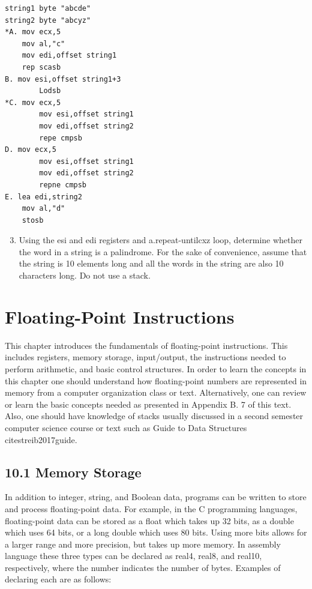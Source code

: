 \documentclass[10pt]{book}
\begin{document}
\begin{verbatim}
string1 byte "abcde"
string2 byte "abcyz"
*A. mov ecx,5
    mov al,"c"
    mov edi,offset string1
    rep scasb
B. mov esi,offset string1+3
        Lodsb
*C. mov ecx,5
        mov esi,offset string1
        mov edi,offset string2
        repe cmpsb
D. mov ecx,5
        mov esi,offset string1
        mov edi,offset string2
        repne cmpsb
E. lea edi,string2
    mov al,"d"
    stosb
\end{verbatim}

\begin{enumerate}
  \setcounter{enumi}{2}
  \item Using the esi and edi registers and a.repeat-untilcxz loop, determine whether the word in a string is a palindrome. For the sake of convenience, assume that the string is 10 elements long and all the words in the string are also 10 characters long. Do not use a stack.
\end{enumerate}


\section*{Floating-Point Instructions}
This chapter introduces the fundamentals of floating-point instructions. This includes registers, memory storage, input/output, the instructions needed to perform arithmetic, and basic control structures. In order to learn the concepts in this chapter one should understand how floating-point numbers are represented in memory from a computer organization class or text. Alternatively, one can review or learn the basic concepts needed as presented in Appendix B. 7 of this text. Also, one should have knowledge of stacks usually discussed in a second semester computer science course or text such as Guide to Data Structures \\cite{streib2017guide}.


\subsection*{10.1 Memory Storage}
In addition to integer, string, and Boolean data, programs can be written to store and process floating-point data. For example, in the C programming languages, floating-point data can be stored as a float which takes up 32 bits, as a double which uses 64 bits, or a long double which uses 80 bits. Using more bits allows for a larger range and more precision, but takes up more memory. In assembly language these three types can be declared as real4, real8, and real10, respectively, where the number indicates the number of bytes. Examples of declaring each are as follows:
\end{document}
